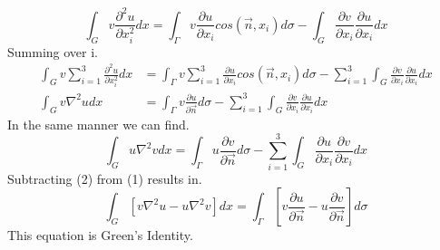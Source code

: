 \[
    \int_G v\frac{\partial^2 u}{\partial x_{i}^{2}} dx = \int_\Gamma v\frac{\partial u}{\partial x_i}cos(\vec{n},x_i) d\sigma - \int_G \frac{\partial v}{\partial x_i}\frac{\partial u}{\partial x_i} dx    
\]
Summing over i.
\begin{align}
\int_G v\sum_{i=1}^{3}\frac{\partial^2 u}{\partial x_{i}^{2}} dx &= \int_\Gamma v\sum_{i=1}^{3}\frac{\partial u}{\partial x_i}cos(\vec{n},x_i) d\sigma - \sum_{i=1}^{3}\int_G \frac{\partial v}{\partial x_i}\frac{\partial u}{\partial x_i} dx 
\nonumber
\\ 
\int_G v\nabla^2 u dx &= \int_\Gamma v\frac{\partial u}{\partial \vec{n}} d\sigma - \sum_{i=1}^{3}\int_G \frac{\partial v}{\partial x_i}\frac{\partial u}{\partial x_i} dx
\end{align}
In the same manner we can find.
\begin{equation}
\int_G u\nabla^2 v dx = \int_\Gamma u\frac{\partial v}{\partial \vec{n}} d\sigma - \sum_{i=1}^{3}\int_G \frac{\partial u}{\partial x_i}\frac{\partial v}{\partial x_i} dx
\end{equation}
Subtracting (2) from (1) results in.
\[
    \int_G \left[v\nabla^2 u - u\nabla^2 v\right]dx = \int_\Gamma \left[v\frac{\partial u}{\partial \vec{n}}-u\frac{\partial v}{\partial \vec{n}}\right] d\sigma    
\]
This equation is Green's Identity.


